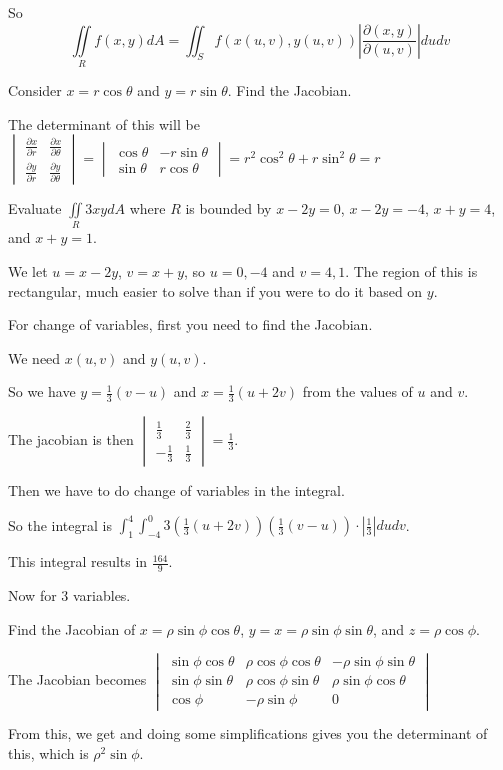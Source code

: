 \documentclass[../calc3.tex]{subfiles}
\begin{document}
So 
\[ \iint\limits_{R} f(x,y)dA = \iint_S f(x(u,v),y(u,v))\left| \frac{\partial (x,y)}{\partial (u,v)}\right| du dv \]

\begin{example}
    Consider $x=r\cos\theta$ and $y=r\sin\theta$. Find the Jacobian.

    The determinant of this will be $\begin{vmatrix}
        \frac{\partial x}{\partial r} & \frac{\partial x}{\partial \theta}\\
        \frac{\partial y}{\partial r} & \frac{\partial y}{\partial \theta}
    \end{vmatrix} = \begin{vmatrix}
        \cos\theta & -r\sin\theta \\ \sin\theta & r\cos\theta
    \end{vmatrix} = r^2\cos^2\theta + r\sin^2\theta = r$
\end{example}

\pagebreak
\begin{example}
    Evaluate $\iint\limits_{R} 3xydA$ where $R$ is bounded by $x-2y=0$, $x-2y=-4$, $x+y=4$, and $x+y=1$.

    We let $u=x-2y$, $v=x+y$, so $u=0,-4$ and $v=4,1$. The region of this is rectangular, much easier to solve than if you were to do it based on $y$.

    For change of variables, first you need to find the Jacobian.

    We need $x(u,v)$ and $y(u,v)$.

    So we have $y=\frac{1}{3}(v-u)$ and $x=\frac{1}{3}(u+2v)$ from the values of $u$ and $v$.

    The jacobian is then $\begin{vmatrix}
        \frac{1}{3} & \frac{2}{3} \\ -\frac{1}{3} & \frac{1}{3}
    \end{vmatrix} = \frac{1}{3}$.

    Then we have to do change of variables in the integral.

    So the integral is $\int_1^4 \int_{-4}^0 3\left(\frac{1}{3}(u+2v)\right)\left(\frac{1}{3}(v-u)\right)\cdot \left|\frac{1}{3}\right|du dv$.

    This integral results in $\frac{164}{9}$.
\end{example}

Now for $3$ variables.

\begin{example}
    Find the Jacobian of $x=\rho\sin\phi \cos\theta$, $y=x=\rho\sin\phi\sin\theta$, and $z=\rho\cos\phi$.

    The Jacobian becomes $\begin{vmatrix}
        \sin\phi \cos\theta & \rho\cos\phi\cos\theta & -\rho\sin\phi\sin\theta \\
        \sin\phi\sin\theta & \rho\cos\phi\sin\theta & \rho\sin\phi\cos\theta \\
        \cos\phi & -\rho\sin\phi & 0
    \end{vmatrix}$

    From this, we get and doing some simplifications gives you the determinant of this, which is $\rho^2\sin\phi$.
\end{example}
\end{document}
